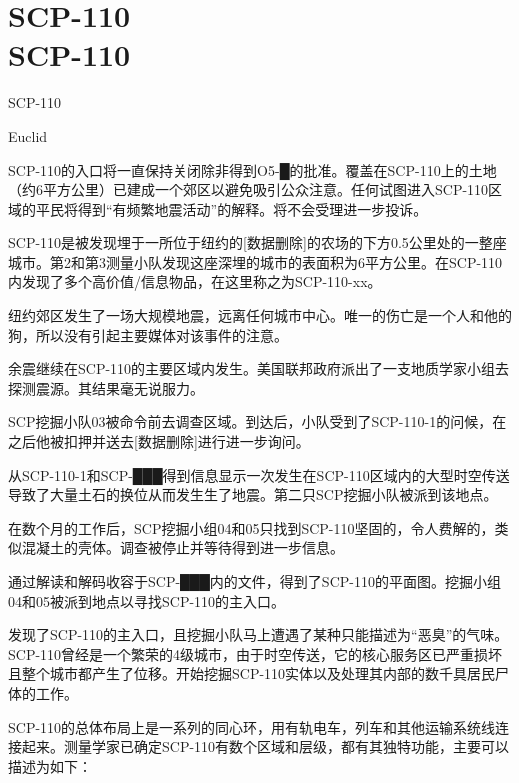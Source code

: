 \chapter[SCP-110]{
    SCP-110 \\
    SCP-110
}

\label{chap:SCP-110}

SCP-110

Euclid

SCP-110的入口将一直保持关闭除非得到O5-█的批准。覆盖在SCP-110上的土地（约6平方公里）已建成一个郊区以避免吸引公众注意。任何试图进入SCP-110区域的平民将得到“有频繁地震活动”的解释。将不会受理进一步投诉。

SCP-110是被发现埋于一所位于纽约的{[}数据删除]的农场的下方0.5公里处的一整座城市。第2和第3测量小队发现这座深埋的城市的表面积为6平方公里。在SCP-110内发现了多个高价值\slash 信息物品，在这里称之为SCP-110-xx。


纽约郊区发生了一场大规模地震，远离任何城市中心。唯一的伤亡是一个人和他的狗，所以没有引起主要媒体对该事件的注意。

余震继续在SCP-110的主要区域内发生。美国联邦政府派出了一支地质学家小组去探测震源。其结果毫无说服力。

SCP挖掘小队03被命令前去调查区域。到达后，小队受到了SCP-110-1的问候，在之后他被扣押并送去{[}数据删除]进行进一步询问。

从SCP-110-1和SCP-███得到信息显示一次发生在SCP-110区域内的大型时空传送导致了大量土石的换位从而发生生了地震。第二只SCP挖掘小队被派到该地点。

在数个月的工作后，SCP挖掘小组04和05只找到SCP-110坚固的，令人费解的，类似混凝土的壳体。调查被停止并等待得到进一步信息。

通过解读和解码收容于SCP-███内的文件，得到了SCP-110的平面图。挖掘小组04和05被派到地点以寻找SCP-110的主入口。

发现了SCP-110的主入口，且挖掘小队马上遭遇了某种只能描述为“恶臭”的气味。SCP-110曾经是一个繁荣的4级城市，由于时空传送，它的核心服务区已严重损坏且整个城市都产生了位移。开始挖掘SCP-110实体以及处理其内部的数千具居民尸体的工作。


SCP-110的总体布局上是一系列的同心环，用有轨电车，列车和其他运输系统线连接起来。测量学家已确定SCP-110有数个区域和层级，都有其独特功能，主要可以描述为如下：

